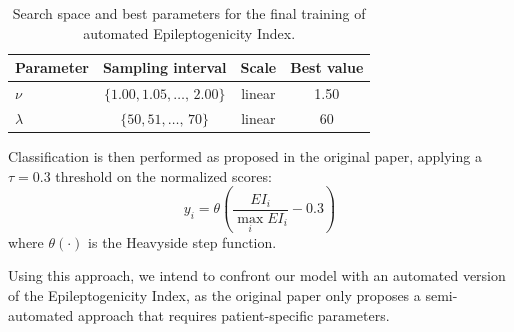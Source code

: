 \begin{table}[H]
\centering
\begin{tabular}{lccc}
\hline
\textbf{Parameter} & \textbf{Sampling interval} & \textbf{Scale} & \textbf{Best value} \\
\hline
$\nu$      & $\{1.00,1.05, \dots,\, 2.00\}$  & linear    & 1.50      \\
$\lambda$  & $\{50,51, \dots,\, 70\}$  & linear & 60     \\ 
\hline
\end{tabular}
\caption{Search space and best parameters for the final training of automated Epileptogenicity Index.}
\label{tab:bartolomei}
\end{table}

Classification is then performed as proposed in the original paper,
applying a $\tau=0.3$ threshold on the normalized scores:
\begin{equation}
    y_i=\theta\left(\frac{EI_i}{\max_i EI_i}-0.3\right)
\end{equation}
where $\theta(\cdot)$ is the Heavyside step function.

Using this approach, we intend to confront our model with an automated version 
of the Epileptogenicity Index, as the original paper only proposes a
semi-automated approach that requires patient-specific parameters.


